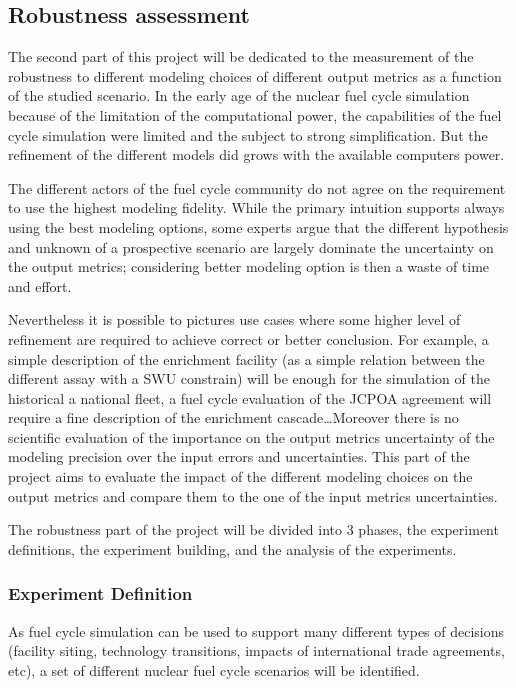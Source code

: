 
\subsection{Robustness assessment}

The second part of this project will be dedicated to the measurement of the
robustness to different modeling choices of different output metrics as a
function of the studied scenario.  In the early age of the nuclear fuel cycle
simulation because of the limitation of the computational power, the
capabilities of the fuel cycle simulation were limited and the subject to strong
simplification. But the refinement of the different models did grows with the
available computers power. 

The different actors of the fuel cycle community do not agree on the requirement
to use the highest modeling fidelity. While the primary intuition supports
always using the best modeling options, some experts argue that the different
hypothesis and unknown of a prospective scenario are largely dominate the
uncertainty on the output metrics; considering better modeling option is then a
waste of time and effort.

Nevertheless it is possible to pictures use cases where some higher level of
refinement are required to achieve correct or better conclusion. For example, a
simple description of the enrichment facility (as a simple relation between the
different assay with a SWU constrain) will be enough for the simulation of the
historical a national fleet, a fuel cycle evaluation of the JCPOA agreement will
require a fine description of the enrichment cascade\dots Moreover there is no
scientific evaluation of the importance on the output metrics uncertainty of the
modeling precision over the input errors and uncertainties. This part of the
project aims to evaluate the impact of the different modeling choices on the
output metrics and compare them to the one of the input metrics uncertainties.

The robustness part of the project will be divided into 3 phases, the experiment
definitions, the experiment building, and the analysis of the experiments.


\subsubsection{Experiment Definition}

As fuel cycle simulation can be used to support many different types of
decisions (facility siting, technology transitions, impacts of international
trade agreements, etc), a set of different nuclear fuel cycle scenarios will be
identified.

